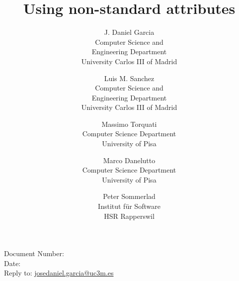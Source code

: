 \documentclass[10pt,a4paper,oneside,final,notitlepage]{article}%
\begin{document}


\begin{flushright}
Document Number: \texttt{\paperid}\\
Date: \paperdate\\
Reply to: \url{josedaniel.garcia@uc3m.es}
\end{flushright}

\title{Using non-standard attributes}
\author{J. Daniel Garcia\\
Computer Science and\\ Engineering Department\\
University Carlos III of Madrid
\and
Luis M. Sanchez\\
Computer Science and\\ Engineering Department\\
University Carlos III of Madrid
\and
Massimo Torquati\\
Computer Science Department\\
University of Pisa
\and
Marco Danelutto\\
Computer Science Department\\
University of Pisa
\and
Peter Sommerlad\\
Institut f\"{u}r Software\\
HSR Rapperswil
}
\date{}

\begingroup
\let\newpage\relax%
\maketitle
\endgroup








\end{document}
